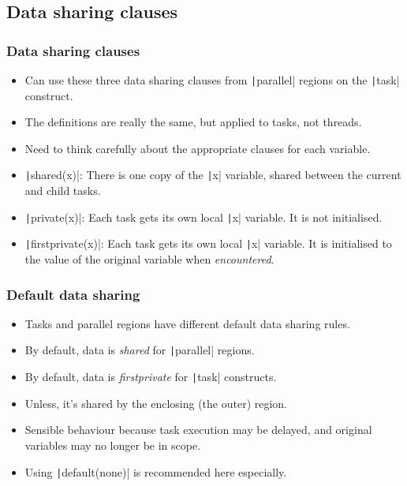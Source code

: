 \documentclass{beamer}
\begin{document}
\subsection{Data sharing clauses}
\begin{frame}
\frametitle{Data sharing clauses}
\begin{itemize}
  \item Can use these three data sharing clauses from \texttt|parallel| regions on the \texttt|task| construct.
  \item The definitions are really the same, but applied to tasks, not threads.
  \item Need to think carefully about the appropriate clauses for each variable.
  \item \texttt|shared(x)|: There is one copy of the \texttt|x| variable, shared between the current and child tasks.
  \item \texttt|private(x)|: Each task gets its own local \texttt|x| variable. It is not initialised.
  \item \texttt|firstprivate(x)|: Each task gets its own local \texttt|x| variable. It is initialised to the value of the original variable when \emph{encountered}.
\end{itemize}
\end{frame}

\begin{frame}
\frametitle{Default data sharing}
\begin{itemize}
  \item Tasks and parallel regions have different default data sharing rules.
  \item By default, data is \emph{shared} for \texttt|parallel| regions.
  \item By default, data is \emph{firstprivate} for \texttt|task| constructs.
  \item Unless, it's shared by the enclosing (the outer) region.
  \item Sensible behaviour because task execution may be delayed, and original variables may no longer be in scope.
  \item Using \texttt|default(none)| is recommended here especially.
\end{itemize}
\end{frame}
\end{document}
